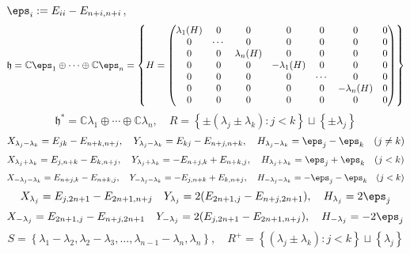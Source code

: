 \documentclass[reqno]{amsart} 
\begin{document}
$\eps_i := E_{i i} - E_{n+i,n+i}$,
\begin{equation*}
  \mathfrak{h} = \mathbb{C} \eps_1 \oplus \dotsb \oplus \mathbb{C} \eps_n = \left\{ H = 
\begin{pmatrix}
    \lambda_1(H) & 0 & 0 & 0 & 0 & 0 & 0  \\
    0 & \dotsb & 0 & 0 & 0 & 0 & 0  \\
    0 & 0 & \lambda_n(H) & 0 & 0 & 0 & 0  \\
    0 & 0 & 0 & -\lambda_1(H) & 0 & 0 & 0 \\
    0 & 0 & 0 & 0 & \dotsb & 0 & 0 \\
    0 & 0 & 0 & 0 & 0 & -\lambda_n(H) & 0  \\
    0 & 0 & 0 & 0 & 0 & 0 & 0
  \end{pmatrix}
\right\}
\end{equation*}
\begin{equation*}
  \mathfrak{h}^* = \mathbb{C} \lambda_1 \oplus \dotsb \oplus \mathbb{C} \lambda_n, \quad R = \left\{ \pm (\lambda_j \pm \lambda_k) : j < k \right\} \sqcup \left\{ \pm \lambda_j \right\}
\end{equation*}
\begin{equation*}
  X_{\lambda_j - \lambda_k} = E_{j k} - E_{n+k,n+j}, \quad Y_{\lambda_j - \lambda_k} = E_{k j} - E_{n+j,n+k}, \quad H_{\lambda_j - \lambda_k} = \eps_j - \eps_k \quad (j \neq k)
\end{equation*}
\begin{equation*}
  X_{\lambda_j + \lambda_k} = E_{j,n+k} - E_{k,n+j}, \quad Y_{\lambda_j + \lambda_k} = - E_{n+j, k} + E_{n+k,j}, \quad H_{\lambda_j + \lambda_k} = \eps_j + \eps_k \quad (j < k)
\end{equation*}
\begin{equation*}
  X_{-\lambda_j - \lambda_k} = E_{n+j,k} - E_{n+k,j}, \quad Y_{-\lambda_j - \lambda_k} = -E_{j, n+k} + E_{k,n+j}, \quad H_{-\lambda_j - \lambda_k} = -\eps_j - \eps_k \quad (j < k)
\end{equation*}
\begin{equation*}
  X_{\lambda_j} = E_{j,2 n + 1} - E_{2n+1,n+j} \quad Y_{\lambda_j} = 2(E_{2 n + 1,j} - E_{n+j,2n+1}), \quad H_{\lambda_j} = 2 \eps_j
\end{equation*}
\begin{equation*}
  X_{-\lambda_j} = E_{2 n + 1,j} - E_{n+j,2n+1} \quad Y_{-\lambda_j} = 2(E_{j,2 n + 1} - E_{2n+1,n+j}), \quad H_{-\lambda_j} = -2 \eps_j
\end{equation*}
\begin{equation*}
  S = \left\{ \lambda_1 - \lambda_2, \lambda_2 - \lambda_3, \dotsc, \lambda_{n-1} - \lambda_n, \lambda_n \right\}, \quad R^+ = \left\{ (\lambda_j \pm \lambda_k) : j < k \right\} \sqcup \left\{ \lambda_j \right\}
\end{equation*}
\end{document}
